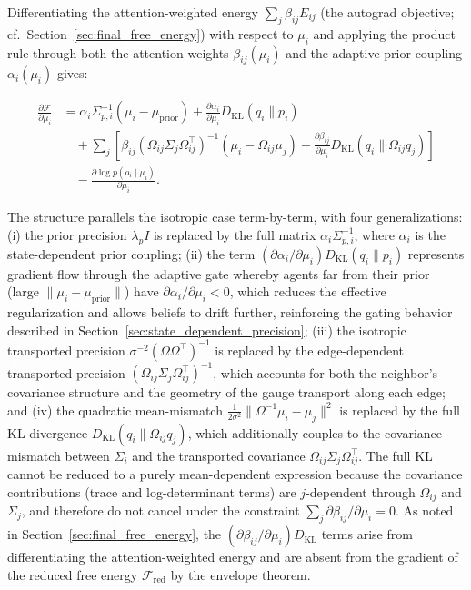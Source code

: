 \documentclass[twoside,11pt]{article}
\begin{document}
Differentiating the attention-weighted energy $\sum_j \beta_{ij} E_{ij}$ (the autograd objective; cf.\ Section~\ref{sec:final_free_energy}) with respect to $\mu_i$ and applying the product rule through both the attention weights $\beta_{ij}(\mu_i)$ and the adaptive prior coupling $\alpha_i(\mu_i)$ gives:

\begin{equation}
\boxed{
\begin{aligned}
\frac{\partial \mathcal{F}}{\partial \mu_i}
&= \alpha_i \Sigma_{p,i}^{-1}\left(\mu_i - \mu_{\text{prior}}\right)
  + \frac{\partial \alpha_i}{\partial \mu_i} 
  D_{\mathrm{KL}}(q_i \| p_i) \\
&\quad + \sum_j \left[
  \beta_{ij} 
  \left(\Omega_{ij}\Sigma_j\Omega_{ij}^\top\right)^{-1}
  \left(\mu_i - \Omega_{ij}\mu_j\right)
  + \frac{\partial \beta_{ij}}{\partial \mu_i} 
  D_{\mathrm{KL}}(q_i \| \Omega_{ij} q_j)
\right] \\
&\quad - \frac{\partial \log p(o_i \mid \mu_i)}{\partial \mu_i}.
\end{aligned}
}
\label{eq:mu_gradient_general}
\end{equation}

The structure parallels the isotropic case term-by-term, with four generalizations: (i) the prior precision $\lambda_p I$ is replaced by the full matrix $\alpha_i \Sigma_{p,i}^{-1}$, where $\alpha_i$ is the state-dependent prior coupling; (ii) the term $(\partial\alpha_i/\partial\mu_i) D_{\mathrm{KL}}(q_i \| p_i)$ represents gradient flow through the adaptive gate whereby agents far from their prior (large $\|\mu_i - \mu_{\text{prior}}\|$) have $\partial\alpha_i/\partial\mu_i < 0$, which reduces the effective regularization and allows beliefs to drift further, reinforcing the gating behavior described in Section~\ref{sec:state_dependent_precision}; (iii) the isotropic transported precision $\sigma^{-2}(\Omega\Omega^\top)^{-1}$ is replaced by the edge-dependent transported precision $(\Omega_{ij}\Sigma_j\Omega_{ij}^\top)^{-1}$, which accounts for both the neighbor's covariance structure and the geometry of the gauge transport along each edge; and (iv) the quadratic mean-mismatch $\frac{1}{2\sigma^2}\|\Omega^{-1}\mu_i - \mu_j\|^2$ is replaced by the full KL divergence $D_{\mathrm{KL}}(q_i \| \Omega_{ij}q_j)$, which additionally couples to the covariance mismatch between $\Sigma_i$ and the transported covariance $\Omega_{ij}\Sigma_j\Omega_{ij}^\top$. The full KL cannot be reduced to a purely mean-dependent expression because the covariance contributions (trace and log-determinant terms) are $j$-dependent through $\Omega_{ij}$ and $\Sigma_j$, and therefore do not cancel under the constraint $\sum_j \partial\beta_{ij}/\partial\mu_i = 0$. As noted in Section~\ref{sec:final_free_energy}, the $(\partial\beta_{ij}/\partial\mu_i) D_{\mathrm{KL}}$ terms arise from differentiating the attention-weighted energy and are absent from the gradient of the reduced free energy $\mathcal{F}_{\mathrm{red}}$ by the envelope theorem.
\end{document}
